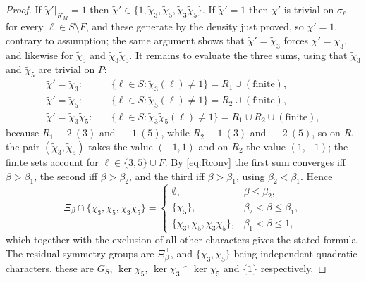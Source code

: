\documentclass[11pt]{amsart}
\numberwithin{equation}{section}
\theoremstyle{definition}
\theoremstyle{remark}
\begin{document}
\begin{proof}
If $\tilde\chi'|_{K_M}=1$ then $\tilde\chi'\in\{1,\tilde\chi_3,\tilde\chi_5,\tilde\chi_3\tilde\chi_5\}$.
If $\tilde\chi'=1$ then $\chi'$ is trivial on $\sigma_\ell$ for every
$\ell\in S\setminus F$, and these generate by the density just proved, so
$\chi'=1$, contrary to assumption; the same argument shows that
$\tilde\chi'=\tilde\chi_3$ forces $\chi'=\chi_3$, and likewise for
$\tilde\chi_5$ and $\tilde\chi_3\tilde\chi_5$. It remains to evaluate the three
sums, using that $\tilde\chi_3$ and $\tilde\chi_5$ are trivial on $P$:
\[
\begin{aligned}
\tilde\chi'=\tilde\chi_3:\quad&\{\ell\in S:\tilde\chi_3(\ell)\neq1\}=R_1\cup(\text{finite}),\\
\tilde\chi'=\tilde\chi_5:\quad&\{\ell\in S:\tilde\chi_5(\ell)\neq1\}=R_2\cup(\text{finite}),\\
\tilde\chi'=\tilde\chi_3\tilde\chi_5:\quad&\{\ell\in S:\tilde\chi_3\tilde\chi_5(\ell)\neq1\}=R_1\cup R_2\cup(\text{finite}),
\end{aligned}
\]
because $R_1\equiv2\ (3)$ and $\equiv1\ (5)$, while $R_2\equiv1\ (3)$ and
$\equiv2\ (5)$, so on $R_1$ the pair $(\tilde\chi_3,\tilde\chi_5)$ takes the
value $(-1,1)$ and on $R_2$ the value $(1,-1)$; the finite sets account for
$\ell\in\{3,5\}\cup F$. By \eqref{eq:Rconv} the first sum converges iff
$\beta>\beta_1$, the second iff $\beta>\beta_2$, and the third iff
$\beta>\beta_1$, using $\beta_2<\beta_1$. Hence
\[
\Xi_\beta\cap\{\chi_3,\chi_5,\chi_3\chi_5\}=
\begin{cases}
\emptyset,&\beta\le\beta_2,\\
\{\chi_5\},&\beta_2<\beta\le\beta_1,\\
\{\chi_3,\chi_5,\chi_3\chi_5\},&\beta_1<\beta\le1,
\end{cases}
\]
which together with the exclusion of all other characters gives the stated
formula. The residual symmetry groups are $\Xi_\beta^\perp$, and
$\{\chi_3,\chi_5\}$ being independent quadratic characters, these are
$G_S$, $\ker\chi_5$, $\ker\chi_3\cap\ker\chi_5$ and $\{1\}$ respectively.
\end{proof}
\end{document}
